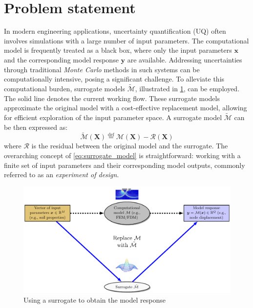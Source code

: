 \section{Problem statement}
In modern engineering applications, uncertainty quantification (UQ) often involves simulations with a large number of input parameters. The computational model is frequently treated as a black box, where only the input parameters $\boldsymbol{x}$ and the corresponding model response $\boldsymbol{y}$ are available. Addressing uncertainties through traditional \textit{Monte Carlo} methods in such systems can be computationally intensive, posing a significant challenge. To alleviate this computational burden, surrogate models $\tilde{\mathcal{M}}$, illustrated in \cref{fig: UQ_surrogate}, can be employed. The solid line denotes the current working flow. These surrogate models approximate the original model with a cost-effective replacement model, allowing for efficient exploration of the input parameter space. A surrogate model $\tilde{\mathcal{M}}$ can be then expressed as:
\begin{equation}
\label{eq:surrogate_model}
    \tilde{\mathcal{M}}(\boldsymbol{X})  \overset{\mathrm{def}}{=} \mathcal{M}(\boldsymbol{X}) - \mathcal{R}(\boldsymbol{X})
\end{equation}
where $\mathcal{R}$ is the residual between the original model and the surrogate. The overarching concept of \cref{eq:surrogate_model} is straightforward: working with a finite set of input parameters and their corresponding model outputs, commonly referred to as an \textit{experiment of design}.
\begin{figure}[htbp]
    \centering
    \includegraphics[width = 140mm]{Figures/figure-UQ_surrogate.pdf}
    \caption{Using a surrogate to obtain the model response}
    \label{fig: UQ_surrogate}
\end{figure}


